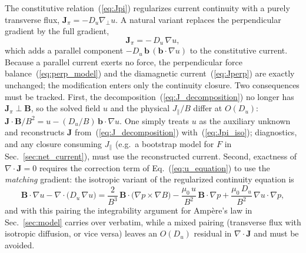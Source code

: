 \documentclass[english]{article}
\newcommand{\bB}{\mathbf{B}}
\newcommand{\bJ}{\mathbf{J}}
\newcommand{\bb}{\mathbf{b}}
\newcommand{\gradperp}{\nabla_{\!\perp}}
\begin{document}
The constitutive relation~(\ref{eq:Jpi}) regularizes current continuity with a purely
transverse flux, $\bJ_\pi=-D_u\gradperp u$. A natural variant replaces the perpendicular
gradient by the full gradient,
\begin{equation}
\bJ_\pi=-\,D_u\,\nabla u ,
\label{eq:Jpi_iso}
\end{equation}
which adds a parallel component $-D_u\,\bb\,(\bb\cdot\nabla u)$ to the constitutive
current. Because a parallel current exerts no force, the perpendicular force
balance~(\ref{eq:perp_model}) and the diamagnetic current~(\ref{eq:Jperp}) are exactly
unchanged; the modification enters only the continuity closure. Two consequences must be
tracked. First, the decomposition~(\ref{eq:J_decomposition}) no longer has
$\bJ_\pi\perp\bB$, so the solved field $u$ and the physical $J_\parallel/B$ differ at
$O(D_u)$: $\bJ\cdot\bB/B^{2}=u-(D_u/B)\,\bb\cdot\nabla u$. One simply treats $u$ as the
auxiliary unknown and reconstructs $\bJ$ from~(\ref{eq:J_decomposition})
with~(\ref{eq:Jpi_iso}); diagnostics, and any closure consuming $J_\parallel$ (e.g.\ a
bootstrap model for $F$ in Sec.~\ref{sec:net_current}), must use the reconstructed
current. Second, exactness of $\nabla\cdot\bJ=0$ requires the correction term of
Eq.~(\ref{eq:u_equation}) to use the \emph{matching} gradient: the isotropic variant of
the regularized continuity equation is
\begin{equation}
\bB\cdot\nabla u-\nabla\cdot\big(D_u\,\nabla u\big)
=\frac{2}{B^{3}}\,\bB\cdot\big(\nabla p\times\nabla B\big)
-\frac{\mu_0\,u}{B^{2}}\,\bB\cdot\nabla p
+\frac{\mu_0\,D_u}{B^{2}}\,\nabla u\cdot\nabla p ,
\label{eq:u_equation_iso}
\end{equation}
and with this pairing the integrability argument for Amp\`ere's law in
Sec.~\ref{sec:model} carries over verbatim, while a mixed pairing (transverse flux with
isotropic diffusion, or vice versa) leaves an $O(D_u)$ residual in $\nabla\cdot\bJ$ and
must be avoided.
\end{document}
